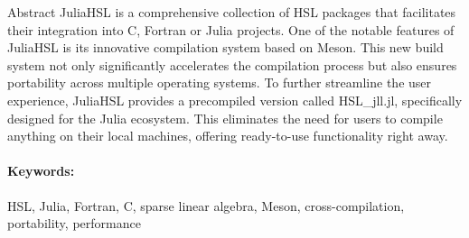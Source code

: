 \documentclass[gdweb]{geradwp}
\newcommand{\HSLjll}{HSL\_jll.jl}
\begin{document}
\GDpageCouverture

\begin{GDpagetitre}

\begin{GDauthlist}
\end{GDauthlist}

\begin{GDaffillist}
\end{GDaffillist}

\begin{GDemaillist}
\end{GDemaillist}

\end{GDpagetitre}


\GDabstracts

\begin{GDabstract}{Abstract}
JuliaHSL is a comprehensive collection of HSL packages that facilitates their integration into C, Fortran or Julia projects.
One of the notable features of JuliaHSL is its innovative compilation system based on Meson.
This new build system not only significantly accelerates the compilation process but also ensures portability across multiple operating systems.
To further streamline the user experience, JuliaHSL provides a precompiled version called \HSLjll, specifically designed for the Julia ecosystem.
This eliminates the need for users to compile anything on their local machines, offering ready-to-use functionality right away.

\paragraph{Keywords: }
HSL, Julia, Fortran, C, sparse linear algebra, Meson, cross-compilation, portability, performance
\end{GDabstract}
\end{document}
